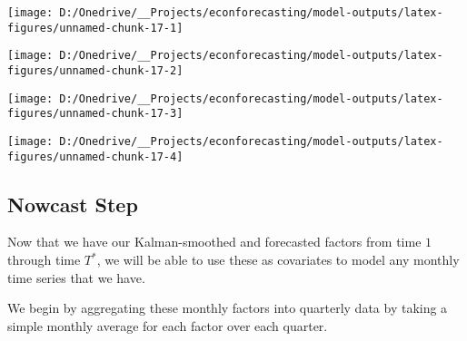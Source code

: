 \documentclass[11pt, letterpaper]{article}\usepackage[]{graphicx}\usepackage[]{color}
\begin{document}
{\centering \texttt{[image: D:/Onedrive/\_\_Projects/econforecasting/model-outputs/latex-figures/unnamed-chunk-17-1]} 

}




{\centering \texttt{[image: D:/Onedrive/\_\_Projects/econforecasting/model-outputs/latex-figures/unnamed-chunk-17-2]} 

}




{\centering \texttt{[image: D:/Onedrive/\_\_Projects/econforecasting/model-outputs/latex-figures/unnamed-chunk-17-3]} 

}




{\centering \texttt{[image: D:/Onedrive/\_\_Projects/econforecasting/model-outputs/latex-figures/unnamed-chunk-17-4]} 

}





\subsection{Nowcast Step}
Now that we have our Kalman-smoothed and forecasted factors from time $1$ through time $T^*$, we will be able to use these as covariates to model any monthly time series that we have.

We begin by aggregating these monthly factors into quarterly data by taking a simple monthly average for each factor over each quarter.
\end{document}
